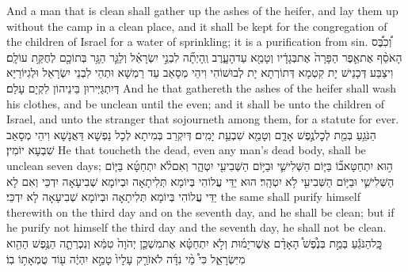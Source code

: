 {And a man that is clean shall gather up the ashes of the heifer, and lay them up without the camp in a clean place, and it shall be kept for the congregation of the children of Israel for a water of sprinkling; it is a purification from sin.}{}
{וְ֠כִבֶּ֠ס הָאֹסֵ֨ף אֶת\maqqaf אֵ֤פֶר הַפָּרָה֙ אֶת\maqqaf בְּגָדָ֔יו וְטָמֵ֖א עַד\maqqaf הָעָ֑רֶב וְֽהָיְתָ֞ה לִבְנֵ֣י יִשְׂרָאֵ֗ל וְלַגֵּ֛ר הַגָּ֥ר בְּתוֹכָ֖ם לְחֻקַּ֥ת עוֹלָֽם׃}
{וִיצַבַּע דְּכָנֵישׁ יָת קִטְמָא דְּתוֹרְתָא יָת לְבוּשׁוֹהִי וִיהֵי מְסָאַב עַד רַמְשָׁא וּתְהֵי לִבְנֵי יִשְׂרָאֵל וּלְגִיּוֹרַיָּא דְּיִתְגַּיְּירוּן בֵּינֵיהוֹן לִקְיָם עָלַם׃}
{And he that gathereth the ashes of the heifer shall wash his clothes, and be unclean until the even; and it shall be unto the children of Israel, and unto the stranger that sojourneth among them, for a statute for ever.}{}
{הַנֹּגֵ֥עַ בְּמֵ֖ת לְכׇל\maqqaf נֶ֣פֶשׁ אָדָ֑ם וְטָמֵ֖א שִׁבְעַ֥ת יָמִֽים׃}
{דְּיִקְרַב בְּמִיתָא לְכָל נַפְשָׁא דַּאֲנָשָׁא וִיהֵי מְסָאַב שִׁבְעָא יוֹמִין׃}
{He that toucheth the dead, even any man’s dead body, shall be unclean seven days;}{}
{ה֣וּא יִתְחַטָּא\maqqaf ב֞וֹ בַּיּ֧וֹם הַשְּׁלִישִׁ֛י וּבַיּ֥וֹם הַשְּׁבִיעִ֖י יִטְהָ֑ר וְאִם\maqqaf לֹ֨א יִתְחַטָּ֜א בַּיּ֧וֹם הַשְּׁלִישִׁ֛י וּבַיּ֥וֹם הַשְּׁבִיעִ֖י לֹ֥א יִטְהָֽר׃}
{הוּא יַדֵּי עֲלוֹהִי בְּיוֹמָא תְּלִיתָאָה וּבְיוֹמָא שְׁבִיעָאָה יִדְכֵּי וְאִם לָא יַדֵּי עֲלוֹהִי בְּיוֹמָא תְּלִיתָאָה וּבְיוֹמָא שְׁבִיעָאָה לָא יִדְכֵּי׃}
{the same shall purify himself therewith on the third day and on the seventh day, and he shall be clean; but if he purify not himself the third day and the seventh day, he shall not be clean.}{}
{כׇּֽל\maqqaf הַנֹּגֵ֡עַ בְּמֵ֣ת בְּנֶ֩פֶשׁ֩ הָאָדָ֨ם אֲשֶׁר\maqqaf יָמ֜וּת וְלֹ֣א יִתְחַטָּ֗א אֶת\maqqaf מִשְׁכַּ֤ן יְהֹוָה֙ טִמֵּ֔א וְנִכְרְתָ֛ה הַנֶּ֥פֶשׁ הַהִ֖וא מִיִּשְׂרָאֵ֑ל כִּי֩ מֵ֨י נִדָּ֜ה לֹא\maqqaf זֹרַ֤ק עָלָיו֙ טָמֵ֣א יִהְיֶ֔ה ע֖וֹד טֻמְאָת֥וֹ בֽוֹ׃}
